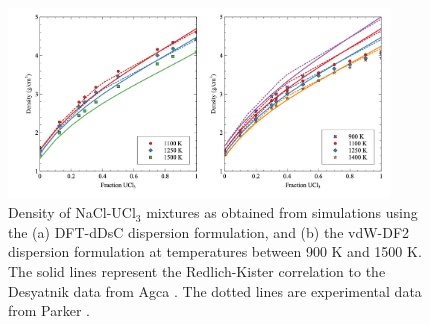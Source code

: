 \documentclass[preprint,3p,10pt,onecolumn,number,sort&compress]{elsarticle}
\begin{document}
{\begin{figure}[htb]
\centering
\includegraphics[width=0.9\textwidth]{fig7.jpg}
\caption{Density of NaCl-UCl$_3$ mixtures as obtained from simulations using the (a) DFT-dDsC dispersion formulation, and (b) the vdW-DF2 dispersion formulation at temperatures between 900 K and 1500 K. The solid lines represent the Redlich-Kister correlation to the Desyatnik \cite{Desyatnik} data from Agca \cite{agca2022}. The dotted lines are experimental data from Parker \cite{Parker}.%
} 
\label{fig:NaClUCl3}
\end{figure}

}
\end{document}
